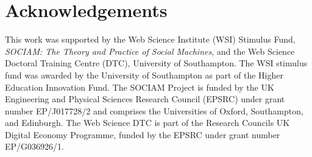 \documentclass{sigchi}
\begin{document}



\section{Acknowledgements}
This work was supported by the Web Science Institute (WSI) Stimulus Fund, \emph{SOCIAM: The Theory and Practice of Social Machines}, and the Web Science Doctoral Training Centre (DTC), University of Southampton. The WSI stimulus fund was awarded by the University of Southampton as part of the Higher Education Innovation Fund. The SOCIAM Project is funded by the UK Engineering and Physical Sciences Research Council (EPSRC) under grant number EP/J017728/2 and comprises the Universities of Oxford, Southampton, and Edinburgh. The Web Science DTC is part of the Research Councils UK Digital Economy Programme, funded by the EPSRC under grant number EP/G036926/1.




\end{document}
